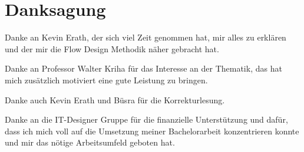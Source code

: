 
\chapter*{Danksagung}
Danke an Kevin Erath, der sich viel Zeit genommen hat, mir alles zu erklären und der mir 
die Flow Design Methodik näher gebracht hat.

Danke an Professor Walter Kriha für das Interesse an der Thematik, das hat mich zusätzlich motiviert eine 
gute Leistung zu bringen.

Danke auch Kevin Erath und Büsra für die Korrekturlesung.

Danke an die IT-Designer Gruppe für die finanzielle Unterstützung
und dafür, dass ich mich voll auf die Umsetzung meiner Bachelorarbeit konzentrieren konnte
und mir das nötige Arbeitsumfeld geboten hat.






